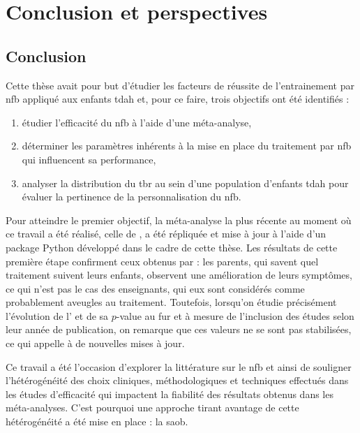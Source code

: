 \chapter{Conclusion et perspectives} \label{chapitre-5}

\section{Conclusion}

Cette thèse avait pour but d'étudier les facteurs de réussite de l'entrainement par \gls{nfb} appliqué aux enfants \gls{tdah} et, pour ce faire, trois objectifs ont été identifiés :
\begin{enumerate}
\item étudier l'efficacité du \gls{nfb} à l'aide d'une méta-analyse,
\item déterminer les paramètres inhérents à la mise en place du traitement par \gls{nfb} qui influencent sa performance,
\item analyser la distribution du \gls{tbr} au sein d'une population d'enfants \gls{tdah} pour évaluer la pertinence de la personnalisation du \gls{nfb}.
\end{enumerate}

Pour atteindre le premier objectif, la méta-analyse la plus récente au moment où ce travail a été réalisé, celle de \citep{Cortese2016}, a été répliquée et mise à jour à l'aide d'un package
Python développé dans le cadre de cette thèse. Les résultats de cette première étape confirment ceux obtenus par \citep{Cortese2016} : les parents, qui savent quel traitement suivent leurs enfants, 
observent une amélioration de leurs symptômes, ce qui n'est pas le cas des enseignants, qui eux sont considérés comme probablement aveugles au traitement. Toutefois, lorsqu'on étudie
précisément l'évolution de l' et de sa $p$-value au fur et à mesure de l'inclusion des études selon leur année de publication, on remarque que ces valeurs ne se sont pas 
stabilisées, ce qui appelle à de nouvelles mises à jour. 

Ce travail a été l'occasion d'explorer 
la littérature sur le \gls{nfb} et ainsi de souligner l'hétérogénéité des choix cliniques, méthodologiques et techniques effectués dans les études d'efficacité qui impactent la fiabilité
des résultats obtenus dans les méta-analyses. C'est pourquoi une approche tirant avantage de cette hétérogénéité a été mise en place : la \gls{saob}.


